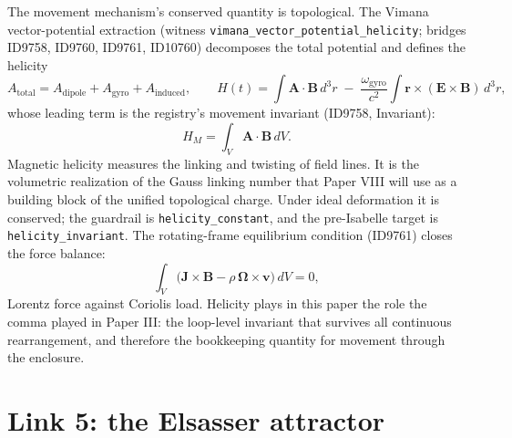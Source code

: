 \documentclass[11pt]{article}
\theoremstyle{remark}
\begin{document}
The movement mechanism's conserved quantity is topological. The Vimana vector-potential extraction (witness \texttt{vimana\_vector\_potential\_helicity}; bridges ID9758, ID9760, ID9761, ID10760) decomposes the total potential and defines the helicity
\begin{equation}
A_{\mathrm{total}} = A_{\mathrm{dipole}} + A_{\mathrm{gyro}} + A_{\mathrm{induced}}, \qquad
H(t) = \int \mathbf{A} \cdot \mathbf{B}\, d^3r \;-\; \frac{\omega_{\mathrm{gyro}}}{c^2} \int \mathbf{r} \times (\mathbf{E} \times \mathbf{B})\, d^3r,
\end{equation}
whose leading term is the registry's movement invariant (ID9758, Invariant):
\begin{equation}
H_M = \int_V \mathbf{A} \cdot \mathbf{B}\, dV.
\label{eq:helicity}
\end{equation}
Magnetic helicity measures the linking and twisting of field lines. It is the volumetric realization of the Gauss linking number that Paper VIII will use as a building block of the unified topological charge. Under ideal deformation it is conserved; the guardrail is \texttt{helicity\_constant}, and the pre-Isabelle target is \texttt{helicity\_invariant}. The rotating-frame equilibrium condition (ID9761) closes the force balance:
\begin{equation}
\int_V \big( \mathbf{J} \times \mathbf{B} - \rho\, \boldsymbol{\Omega} \times \mathbf{v} \big)\, dV = 0,
\end{equation}
Lorentz force against Coriolis load. Helicity plays in this paper the role the comma played in Paper III: the loop-level invariant that survives all continuous rearrangement, and therefore the bookkeeping quantity for movement through the enclosure.

\section{Link 5: the Elsasser attractor}
\label{sec:elsasser}
\end{document}
